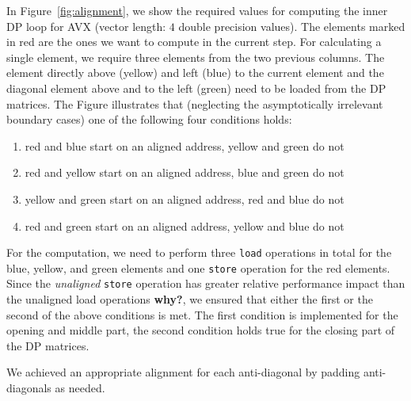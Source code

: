 \documentclass[runningheads,a4paper]{llncs}
\begin{document}
In Figure~\ref{fig:alignment}, we show the required values for computing the inner DP loop for AVX (vector length: $4$ double precision values). 
The elements marked in red are the ones we want to compute in the current step. 
For calculating a single element, we require three elements from the two previous columns. 
The element directly above (yellow) and left (blue) to the current element and the diagonal element above and to the left  (green) need to be loaded from the DP matrices. 
The Figure illustrates that (neglecting the asymptotically irrelevant boundary cases) one of the following four conditions holds:
\begin{enumerate}
  \item red and blue start on an aligned address, yellow and green do not
  \item red and yellow start on an aligned address, blue and green do not
  \item yellow and green start on an aligned address, red and blue do not
  \item red and green start on an aligned address, yellow and blue do not
\end{enumerate}

For the computation, we need to perform three \texttt{load} operations in total for the blue, yellow, and green elements and one \texttt{store} operation for the red elements. 
Since the {\em unaligned} \texttt{store} operation has greater relative performance impact than the unaligned load operations {\bf why?}, 
we ensured that either the first or the second of the above conditions is met. 
The first condition is implemented for the opening and middle part, the second condition holds true for the closing part of the DP matrices.

We achieved an appropriate alignment for each anti-diagonal by padding anti-diagonals as needed. 

\end{document}
